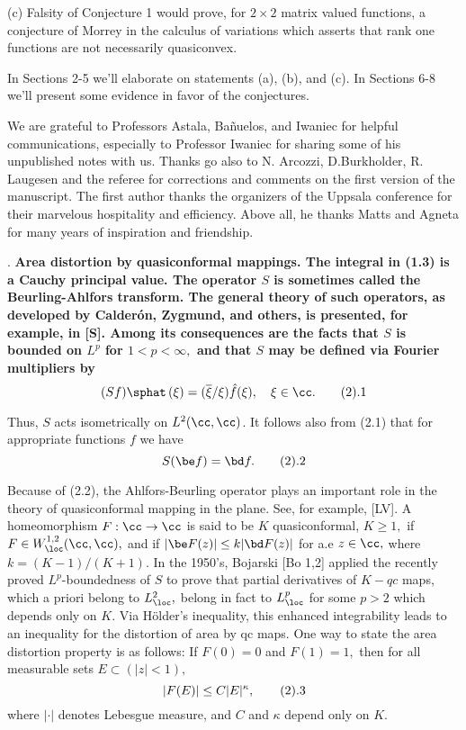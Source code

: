 (c) Falsity of Conjecture 1 would prove, for $2\times 2$ matrix valued 
functions, a 
conjecture of Morrey in the calculus of variations which asserts that 
rank one functions are not necessarily quasiconvex. \medskip

In Sections 2-5 we'll elaborate on statements (a), (b), and (c). In 
Sections 6-8  we'll present some evidence in favor of the conjectures.

We are grateful to Professors Astala, Ba\~nuelos, and Iwaniec for helpful 
communications, especially to Professor Iwaniec for sharing some of his 
unpublished notes with us. Thanks go also to N. Arcozzi, D.Burkholder, R. 
Laugesen and the referee for corrections and comments on the first version of 
the manuscript. The first author thanks the organizers of the 
Uppsala conference for their marvelous hospitality and efficiency. Above all, 
he thanks Matts and Agneta for many years of inspiration and friendship. 

\bigskip

. \bf Area distortion by quasiconformal mappings. \rm The integral in 
(1.3) is a Cauchy principal value. The operator $S$ is sometimes called the 
Beurling-Ahlfors transform. The general theory of such operators, as developed 
by Calder\'on, Zygmund, and others, is presented, 
for example, in [S]. Among its consequences are the facts that $S$ is 
bounded on $L^p$ for  
$1<p<\infty,$ and that $S$ may be defined  via Fourier multipliers by 
$$(Sf)\sphat \,(\xi) = (\overline{\xi}/\xi)\hat f(\xi),\quad \xi \in \cc.\tag2.1$$  

Thus, $S$ acts isometrically on $L^2(\cc, \cc)$. It follows also from (2.1) 
that for appropriate functions $f$ we have $$S(\be f) = \bd f.\tag2.2$$ 

Because of (2.2), the Ahlfors-Beurling operator plays an important role in the 
theory of quasiconformal mapping in the plane. See, for example, [LV].
A homeomorphism $F:\cc 
\rightarrow \cc$ is said to be $K$ quasiconformal, $K\geq 1,$ if $F\in 
W_{\loc}^{1,2}(\cc,\cc),$ and if $|\be F(z)| \leq k|\bd F(z)|$ for a.e $z\in 
\cc,$ where $k = (K-1)/(K+1).$ In the 1950's, Bojarski [Bo 1,2] applied  
the recently proved $L^p$-boundedness of $S$ to prove that partial 
derivatives of $K-qc$  
maps, which a priori belong to $L^2_{\loc},$ belong in fact to $L^p_{\loc}$ for 
some $p>2$ which depends only on $K.$ Via H\"older's inequality, this 
enhanced integrability leads to 
an inequality for the distortion of area by qc maps. One way to state the area 
distortion property is as follows: If $F(0) = 0$ and $F(1) = 1,$ then for 
all measurable sets $E\subset (|z|<1),$  
$$ |F(E)| \leq C |E|^{\kappa},\tag2.3$$
where $|\cdot|$ denotes Lebesgue measure, and $C$ and $\kappa$ depend only on 
$K.$  

